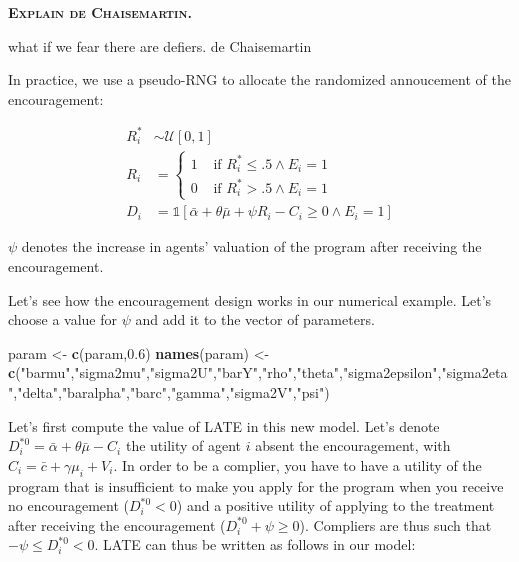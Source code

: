 \documentclass[]{book}
\newenvironment{Shaded}{\begin{snugshade}}{\end{snugshade}}
\newcommand{\FloatTok}[1]{\textcolor[rgb]{0.00,0.00,0.81}{#1}}
\newcommand{\KeywordTok}[1]{\textcolor[rgb]{0.13,0.29,0.53}{\textbf{#1}}}
\newcommand{\NormalTok}[1]{#1}
\newcommand{\StringTok}[1]{\textcolor[rgb]{0.31,0.60,0.02}{#1}}
\newcommand{\uns}[1]{\mathds{1}[ #1 ]}
\theoremstyle{definition}
\theoremstyle{definition}
\theoremstyle{definition}
\theoremstyle{remark}
\let\BeginKnitrBlock\begin \let\EndKnitrBlock\end
\begin{document}
\textbf{\textsc{Explain de Chaisemartin.}}

\BeginKnitrBlock{remark}
\iffalse{} {Remark. } \fi{}what if we fear there are defiers.
de Chaisemartin
\EndKnitrBlock{remark}

\BeginKnitrBlock{remark}
\iffalse{} {Remark. } \fi{}In practice, we use a pseudo-RNG to allocate the randomized annoucement of the encouragement:
\EndKnitrBlock{remark}

\begin{align*}
  R_i^* & \sim \mathcal{U}[0,1]\\
  R_i & = 
  \begin{cases}
    1 & \text{ if } R_i^*\leq .5 \land E_i=1\\
    0 & \text{ if } R_i^*> .5 \land E_i=1
  \end{cases} \\
  D_i & = \uns{\bar{\alpha}+\theta\bar{\mu}+\psi R_i-C_i\geq0 \land E_i=1}
\end{align*}

\(\psi\) denotes the increase in agents' valuation of the program after receiving the encouragement.

\BeginKnitrBlock{example}
\protect\hypertarget{exm:unnamed-chunk-117}{}{\label{exm:unnamed-chunk-117} }Let's see how the encouragement design works in our numerical example.
Let's choose a value for \(\psi\) and add it to the vector of parameters.
\EndKnitrBlock{example}

\begin{Shaded}
\begin{Highlighting}[]
\NormalTok{param <-}\StringTok{ }\KeywordTok{c}\NormalTok{(param,}\FloatTok{0.6}\NormalTok{)}
\KeywordTok{names}\NormalTok{(param) <-}\StringTok{ }\KeywordTok{c}\NormalTok{(}\StringTok{"barmu"}\NormalTok{,}\StringTok{"sigma2mu"}\NormalTok{,}\StringTok{"sigma2U"}\NormalTok{,}\StringTok{"barY"}\NormalTok{,}\StringTok{"rho"}\NormalTok{,}\StringTok{"theta"}\NormalTok{,}\StringTok{"sigma2epsilon"}\NormalTok{,}\StringTok{"sigma2eta"}\NormalTok{,}\StringTok{"delta"}\NormalTok{,}\StringTok{"baralpha"}\NormalTok{,}\StringTok{"barc"}\NormalTok{,}\StringTok{"gamma"}\NormalTok{,}\StringTok{"sigma2V"}\NormalTok{,}\StringTok{"psi"}\NormalTok{)}
\end{Highlighting}
\end{Shaded}

Let's first compute the value of LATE in this new model.
Let's denote \(D_i^{*0}=\bar{\alpha}+\theta\bar{\mu}-C_i\) the utility of agent \(i\) absent the encouragement, with \(C_i=\bar{c} + \gamma \mu_i + V_i\).
In order to be a complier, you have to have a utility of the program that is insufficient to make you apply for the program when you receive no encouragement (\(D_i^{*0}<0\)) and a positive utility of applying to the treatment after receiving the encouragement (\(D_i^{*0}+\psi\geq 0\)).
Compliers are thus such that \(-\psi\leq D_i^{*0}<0\).
LATE can thus be written as follows in our model:
\end{document}
